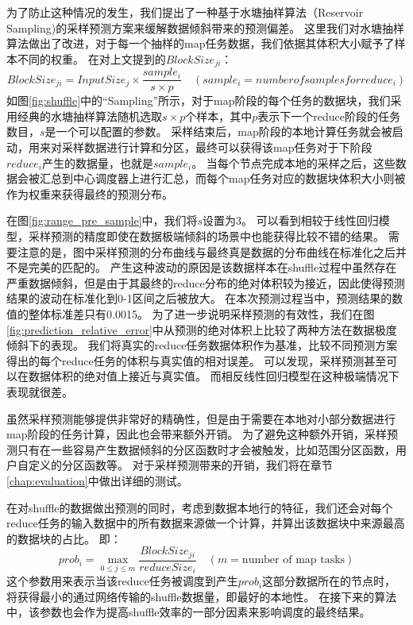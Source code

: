 为了防止这种情况的发生，我们提出了一种基于水塘抽样算法（Reservoir Sampling)\cite{reservoir}的采样预测方案来缓解数据倾斜带来的预测偏差。
这里我们对水塘抽样算法做出了改进，对于每一个抽样的map任务数据，我们依据其体积大小赋予了样本不同的权重。
在对上文提到的$BlockSize_{ji}$：
\begin{equation}
	\label{eq:sample}
	BlockSize_{ji} = {{InputSize_j \times \frac{sample_i}{s \times p}}} \quad (sample_i = number of samples for reduce_i)
\end{equation}
如图\ref{fig:shuffle}中的“Sampling”所示，对于map阶段的每个任务的数据块，我们采用经典的水塘抽样算法随机选取$s \times p$个样本，其中$p$表示下一个reduce阶段的任务数目，$s$是一个可以配置的参数。
采样结束后，map阶段的本地计算任务就会被启动，用来对采样数据进行计算和分区，最终可以获得该map任务对于下阶段$reduce_i$产生的数据量，也就是$sample_i$。
当每个节点完成本地的采样之后，这些数据会被汇总到中心调度器上进行汇总，而每个map任务对应的数据块体积大小则被作为权重来获得最终的预测分布。

在图\ref{fig:range_pre_sample}中，我们将$s$设置为3。
可以看到相较于线性回归模型，采样预测的精度即使在数据极端倾斜的场景中也能获得比较不错的结果。
需要注意的是，图中采样预测的分布曲线与最终真是数据的分布曲线在标准化之后并不是完美的匹配的。
产生这种波动的原因是该数据样本在shuffle过程中虽然存在严重数据倾斜，但是由于其最终的reduce分布的绝对体积较为接近，因此使得预测结果的波动在标准化到0-1区间之后被放大。
在本次预测过程当中，预测结果的数值的整体标准差只有0.0015。
为了进一步说明采样预测的有效性，我们在图\ref{fig:prediction_relative_error}中从预测的绝对体积上比较了两种方法在数据极度倾斜下的表现。
我们将真实的reduce任务数据体积作为基准，比较不同预测方案得出的每个reduce任务的体积与真实值的相对误差。
可以发现，采样预测甚至可以在数据体积的绝对值上接近与真实值。
而相反线性回归模型在这种极端情况下表现就很差。

虽然采样预测能够提供非常好的精确性，但是由于需要在本地对小部分数据进行map阶段的任务计算，因此也会带来额外开销。
为了避免这种额外开销，采样预测只有在一些容易产生数据倾斜的分区函数时才会被触发，比如范围分区函数，用户自定义的分区函数等。
对于采样预测带来的开销，我们将在章节\ref{chap:evaluation}中做出详细的测试。

在对shuffle的数据做出预测的同时，考虑到数据本地行的特征，我们还会对每个reduce任务的输入数据中的所有数据来源做一个计算，并算出该数据块中来源最高的数据块的占比。
即：
\begin{equation}
	\label{eq:prob}
	prob_i = \max_{0 \leq j \leq m} \frac{BlockSize_{ji}}{reduceSize_i} \quad (m = \text{number of map tasks})
\end{equation}
这个参数用来表示当该reduce任务被调度到产生$prob_i$这部分数据所在的节点时，将获得最小的通过网络传输的shuffle数据量，即最好的本地性。
在接下来的算法中，该参数也会作为提高shuffle效率的一部分因素来影响调度的最终结果。

